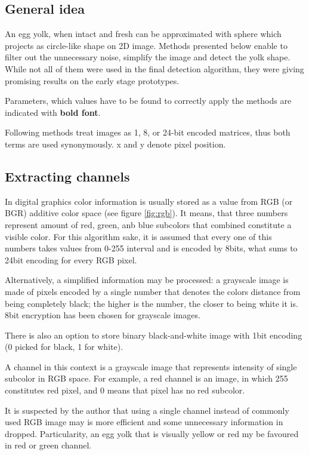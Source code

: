 \documentclass[12pt,twoside,a4paper]{article}
\begin{document}
\subsection{General idea}
An egg yolk, when intact and fresh can be approximated with sphere which projects as circle-like shape on 2D image.
Methods presented below enable to filter out the unnecessary noise, simplify the image and detect the yolk shape.
While not all of them were used in the final detection algorithm, they were giving promising results on the early stage prototypes.

Parameters, which values have to be found to correctly apply the methods are indicated with \textbf{bold font}.

Following methods treat images as 1, 8, or 24-bit encoded matrices, thus both terms are used synonymously.
x and y denote pixel position.
\subsection{Extracting channels}
In digital graphics color information is usually stored as a value from RGB (or BGR) additive color space (see figure \ref{fig:rgb}).
It means, that three numbers represent amount of red, green, anb blue subcolors that combined constitute a visible color.
For this algorithm sake, it is assumed that every one of this numbers takes values from 0-255 interval and is encoded by 8bits, what sums to 24bit encoding for every RGB pixel.

Alternatively, a simplified information may be processed: a grayscale image is made of pixels encoded by a single number that denotes the colors distance from being completely black; the higher is the number, the closer to being white it is.
8bit encryption has been chosen for grayscale images.

There is also an option to store binary black-and-white image with 1bit encoding (0 picked for black, 1 for white).
 
A channel in this context is a grayscale image that represents intensity of single subcolor in RGB space. 
For example, a red channel is an image, in which 255 constitutes red pixel, and 0 means that pixel has no red subcolor.

It is suspected by the author that using a single channel instead of commonly used RGB image may is more efficient and some unnecessary information in dropped.
Particularity, an egg yolk that is visually yellow or red my be favoured in red or green channel.
\end{document}
